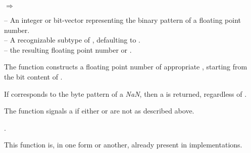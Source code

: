 \documentclass[../Float-Infinities-Nan.tex]{subfiles}
\begin{document}

\DSyntax{}

  
$\Rightarrow$ 

\DArgsNValues{}

 -- An integer or bit-vector representing the binary
pattern of a floating point number.\\
 -- A recognizable subtype of ,
defaulting to .\\
 -- the resulting floating point number or .


\DDescription{}

The function constructs a floating point number of appropriate
, starting from the bit content of
.

If  corresponds to the byte pattern of a \emph{NaN},
then a  is returned, regardless of .

\DExceptional{}

The function signals a  if either  or
 are not as described above.

\DSeeAlso{}

.

\DNotes{}

This function is, in one form or another, already present in \CL{}
implementations.
\end{document}
